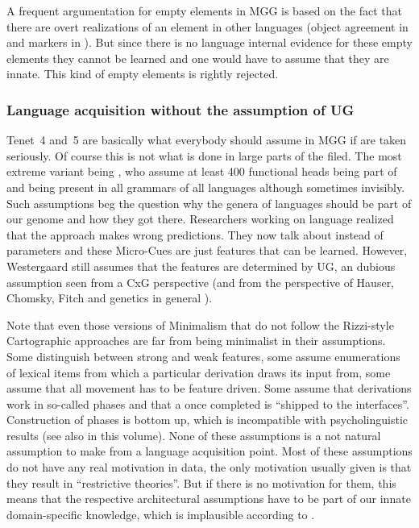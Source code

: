 \documentclass[output=paper]{langsci/langscibook}
\begin{document}
A frequent argumentation for empty elements in MGG is based on the fact that there are overt
realizations of an element in other languages (\eg object agreement in  and  markers in
). But since there is no language internal evidence for these empty elements they cannot be
learned and one would have to assume that they are innate. This kind of empty elements is rightly
rejected. 


\subsubsection{Language acquisition without the assumption of UG}

Tenet~4 and~5 are basically what everybody should assume in MGG if \citet*{HCF2002a} are taken seriously. Of
course this is not what is done in large parts of the filed. The most extreme variant being
\citet{CR2010a}, who assume at least 400 functional heads being part of  and being present in all grammars of all languages although sometimes
invisibly. Such assumptions beg the question why the genera of  languages should be part of our
genome and how they got there. 
Researchers working on language  realized that the 
approach \citep{Meisel95a} makes wrong predictions. They now talk about  instead of
parameters \citep{Westergaard2014a} and these Micro-Cues are just features that can be
learned. However, Westergaard still assumes that the features are determined by UG, an dubious
assumption seen from a CxG perspective (and from the perspective of Hauser, Chomsky, Fitch and
genetics in general \citep{Bishop2002a}).

Note that even those versions of Minimalism that do not follow the Rizzi-style Cartographic
approaches are far from being minimalist in their assumptions. Some distinguish between strong
and weak features, some assume enumerations of lexical items from which a particular derivation
draws its input from, some assume that all movement has to be feature driven. Some assume that
derivations work in so-called phases and that a  once completed is ``shipped to the
interfaces''. Construction of phases is bottom up, which is incompatible with psycholinguistic
results (see also \citealt[Section~\ref{sec-minimalism-processing}]{BM2018Minimalism} in this
volume). None of these assumptions is a not natural assumption to make from a
language acquisition point. Most of these assumptions do not have any real motivation in data, the
only motivation usually given is that they result in ``restrictive theories''. But if there is no
motivation for them, this means that the respective architectural assumptions have to be part of our
innate domain-specific knowledge, which is implausible according to \citet*{HCF2002a}.
\end{document}
